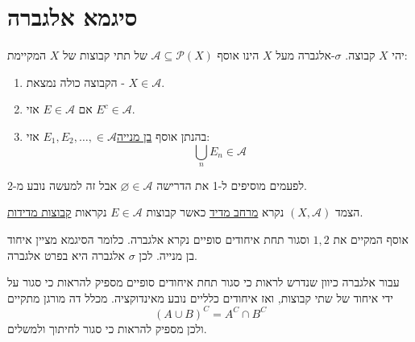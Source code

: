 \documentclass{tstextbook}
\begin{document}
\section{סיגמא אלגברה}

\begin{definition}
יהי \(X\) קבוצה. \(\sigma\)-אלגברה מעל \(X\) הינו אוסף \(\mathcal{A}\subseteq \mathcal{P}(X)\) של תתי קבוצות של \(X\) המקיימת:

  \begin{enumerate}
    \item הקבוצה כולה נמצאת - \(X \in \mathcal{A}\). 


    \item אם \(E \in \mathcal{A}\) אזי \(E^{c} \in \mathcal{A}\). 


    \item בהנתן אוסף \underline{בן מנייה}\(E_{1}, E_{2},\dots, \in \mathcal{A}\) אזי: 
$$\bigcup_{n}E_{n}\in \mathcal{A}$$


  \end{enumerate}
\end{definition}
\begin{remark}
לפעמים מוסיפים ל-1 את הדרישה \(\varnothing \in \mathcal{A}\) אבל זה למעשה נובע מ-2.

\end{remark}
\begin{definition}
הצמד \((X,\mathcal{A})\) נקרא \underline{מרחב מדיד} כאשר קבוצות \(E \in \mathcal{A}\) נקראות \underline{קבוצות מדידות}.

\end{definition}
\begin{definition}[אלגברה]
אוסף המקיים את \(1,2\) וסגור תחת איחודים סופיים נקרא אלגברה. כלומר הסיגמא מציין איחוד בן מנייה. לכן \(\sigma\) אלגברה היא בפרט אלגברה.

\end{definition}
\begin{remark}
עבור אלגברה כיוון שנדרש לראות כי סגור תחת איחודים סופיים מספיק להראות כי סגור על ידי איחוד של שתי קבוצות, ואז איחודים כלליים נובע מאינדוקציה. מכלל דה מורגן מתקיים
$$\left( A\cup B \right)^{C}=A^{C}\cap B^{C}$$
ולכן מספיק להראות כי סגור לחיתוך ולמשלים.

\end{remark}
\end{document}
